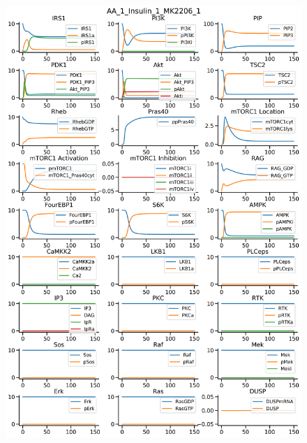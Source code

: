 \documentclass{beamer}
\begin{document}
\begin{frame}
\begin{figure}
\begin{minipage}{0.45\textwidth}
        \includegraphics[width=\textwidth]{../simulations/ExtendedPI3KModel/validations/AAWithInsulinWithMK2206/AA_1_Insulin_1_MK2206_1-7.png}
    \end{minipage}
\end{figure}
\end{frame}

\end{document}
